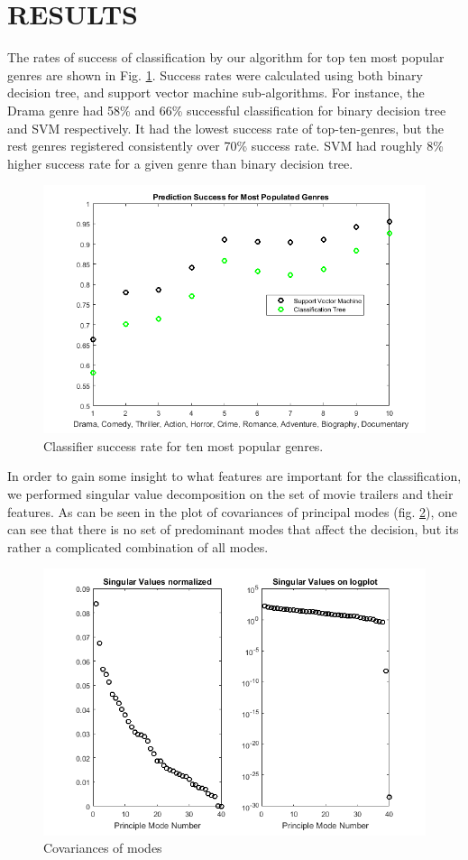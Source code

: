 \documentclass[letterpaper, 10 pt, conference]{ieeeconf}  %
\begin{document}
\section{RESULTS}
The rates of success of classification by our algorithm for top ten most popular genres are shown in Fig. \ref{f:success_rate}. Success rates were calculated using both binary decision tree, and support vector machine sub-algorithms. For instance, the Drama genre had 58\% and 66\% successful classification for binary decision tree and SVM respectively. It had the lowest success rate of top-ten-genres, but the rest genres registered consistently over 70\% success rate. SVM had roughly 8\% higher success rate for a given genre than binary decision tree.\\
\begin{figure}[h]
	\centering
	\includegraphics[width=\columnwidth]{TreeVsSVM.png}
	\caption{Classifier success rate for ten most popular genres.}
	\label{f:success_rate}
\end{figure}
In order to gain some insight to what features are important for the classification, we performed singular value decomposition on the set of movie trailers and their features. As can be seen in the plot of covariances of principal modes (fig. \ref{f:mode_covar}), one can see that there is no set of predominant modes that affect the decision, but its rather a complicated combination of all modes.
\begin{figure}[h]
	\centering
	\includegraphics[width=\columnwidth]{singValues.png}
	\caption{Covariances of modes}
	\label{f:mode_covar}
\end{figure}
\end{document}
